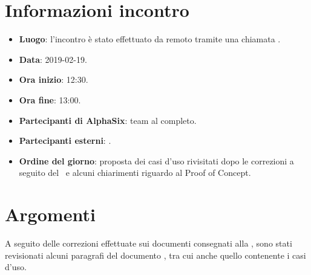 \newcommand{\documento}{\VE}
\newcommand{\nomedocumentofisico}{VE\_2019-02-19.pdf}
\newcommand{\redazione}{\TG}
\newcommand{\verifica}{\SG}
\newcommand{\approvazione}{\CV}
\newcommand{\versione}{1.0.0}
\newcommand{\uso}{Esterno}
\newcommand{\destinateTo}{\TV, \\ & \RC, \\ & \II}
\newcommand{\datacreazione}{19 febbraio 2019}
\newcommand{\datamodifica}{21 febbraio 2019}
\newcommand{\stato}{Approvato}

\def\TABELLE{false}	%
\def\FIGURE{false} 	%






    

    
    
    \section{Informazioni incontro}
    	\begin{itemize}
    		\item \textbf{Luogo}: l'incontro è stato effettuato da remoto tramite una chiamata .
    		\item \textbf{Data}: 2019-02-19.
    		\item \textbf{Ora inizio}: 12:30.
    		\item \textbf{Ora fine}: 13:00.
    		\item \textbf{Partecipanti di AlphaSix}: team al completo.
    		\item \textbf{Partecipanti esterni}: \RC.
    		\item \textbf{Ordine del giorno}: proposta dei casi d'uso rivisitati dopo le correzioni a seguito del \RR~e alcuni chiarimenti riguardo al Proof of Concept.
    		
    	\end{itemize}
    
    \section{Argomenti}
    	A seguito delle correzioni effettuate sui documenti consegnati alla \RR, sono stati revisionati alcuni paragrafi del documento , tra cui anche quello contenente i casi d'uso.
    	
